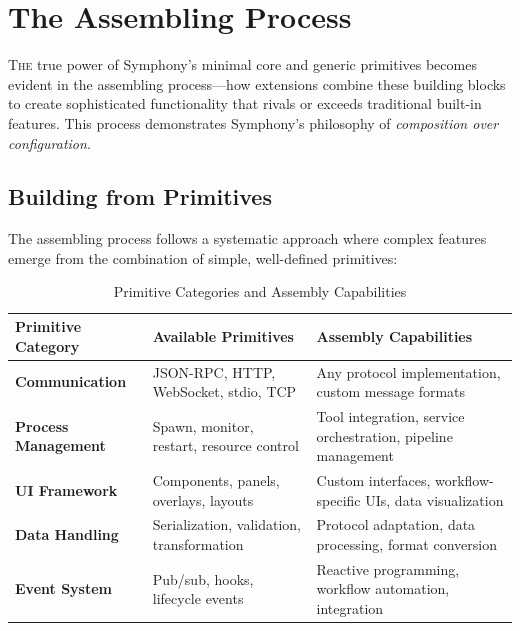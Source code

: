 
\section*{The Assembling Process}

\lettrine{T}{he} true power of Symphony's minimal core and generic primitives becomes evident in the assembling process—how extensions combine these building blocks to create sophisticated functionality that rivals or exceeds traditional built-in features. This process demonstrates Symphony's philosophy of \textit{composition over configuration}.

\subsection*{Building from Primitives}

The assembling process follows a systematic approach where complex features emerge from the combination of simple, well-defined primitives:

\begin{table}[ht]
\centering
\begin{tabular}{@{}p{}p{}p{}@{}}
\toprule
\textbf{Primitive Category} & \textbf{Available Primitives} & \textbf{Assembly Capabilities} \\
\midrule
\textbf{Communication} & 
JSON-RPC, HTTP, WebSocket, stdio, TCP & 
Any protocol implementation, custom message formats \\
\midrule
\textbf{Process Management} & 
Spawn, monitor, restart, resource control & 
Tool integration, service orchestration, pipeline management \\
\midrule
\textbf{UI Framework} & 
Components, panels, overlays, layouts & 
Custom interfaces, workflow-specific UIs, data visualization \\
\midrule
\textbf{Data Handling} & 
Serialization, validation, transformation & 
Protocol adaptation, data processing, format conversion \\
\midrule
\textbf{Event System} & 
Pub/sub, hooks, lifecycle events & 
Reactive programming, workflow automation, integration \\
\bottomrule
\end{tabular}
\caption{Primitive Categories and Assembly Capabilities}
\end{table}

